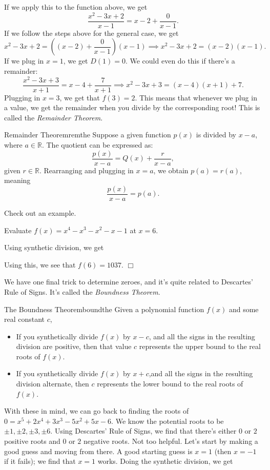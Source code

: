 \documentclass[lang=en,11pt]{elegantbook}
\begin{document}
If we apply this to the function above, we get $$\dfrac{x^2-3x+2}{x-1}=x-2+\dfrac{0}{x-1}.$$ If we follow the steps above for the general case, we get $$x^2-3x+2=\left((x-2)+\dfrac{0}{x-1}\right)(x-1) \implies x^2-3x+2=(x-2)(x-1).$$ If we plug in $x=1$, we get $D(1)=0.$ We could even do this if there's a remainder: $$\dfrac{x^2-3x+3}{x+1}=x-4+\frac{7}{x+1} \implies x^2-3x+3=(x-4)(x+1)+7.$$ Plugging in $x=3$, we get that $f(3)=2$. This means that whenever we plug in a value, we get the remainder when you divide by the corresponding root! This is called the \textit{Remainder Theorem}.
\begin{theorem}{Remainder Theorem}{remthe}
Suppose a given function $p(x)$ is divided by $x-a$, where $a\in\mathbb{R}$. The quotient can be expressed as: $$\dfrac{p(x)}{x-a}=Q(x)+\dfrac{r}{x-a},$$ given $r\in\mathbb{R}$. Rearranging and plugging in $x=a$, we obtain $p(a)=r(a)$, meaning $$\dfrac{p(x)}{x-a}=p(a).$$
\end{theorem}
Check out an example.
\begin{example}
Evaluate $f(x)=x^4-x^3-x^2-x-1$ at $x=6$.
\end{example}
\begin{solution}
Using synthetic division, we get


Using this, we see that $f(6)=1037$. $\Box$
\end{solution}
We have one final trick to determine zeroes, and it's quite related to Descartes' Rule of Signs.  It's called the \textit{Boundness Theorem}.
\begin{theorem}{The Boundness Theorem}{boundthe}
Given a polynomial function $f(x)$ and some real constant $c$, \begin{itemize}
    \item If you synthetically divide $f(x)$ by $x-c$, and all the signs in the resulting division are positive, then that value $c$ represents the upper bound to the real roots of $f(x)$.
    \item If you synthetically divide $f(x)$ by $x+c$,and all the signs in the resulting division alternate, then $c$ represents the lower bound to the real roots of $f(x)$.
\end{itemize}
\end{theorem}
With these in mind, we can go back to finding the roots of $0=x^5+2x^4+3x^3-5x^2+5x-6$.  We know the potential roots to be $\pm 1,\pm 2,\pm 3,\pm 6$.  Using Descartes' Rule of Signs, we find that there's either $0$ or $2$ positive roots and $0$ or $2$ negative roots.  Not too helpful.  Let's start by making a good guess and moving from there.  A good starting guess is $x=1$ (then $x=-1$ if it fails); we find that $x=1$ works.  Doing the synthetic division, we get
\end{document}
